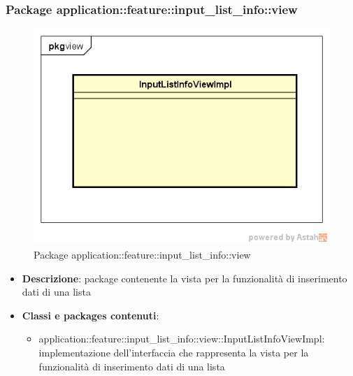 \subsubsection{Package application::feature::input\_list\_info::view}
\label{Package application::feature::input_list_info::view}
\begin{figure}[H]
	\centering
	\includegraphics[scale=0.5]{Sezioni/Packages/Application/input_list_info_view.png}
	\caption{Package application::feature::input\_list\_info::view}
\end{figure}
\begin{itemize}
	\item \textbf{Descrizione}: package contenente la vista per la funzionalità di inserimento dati di una lista
	\item \textbf{Classi e packages contenuti}:
	\begin{itemize}
	\item application::feature::input\_list\_info::view::InputListInfoViewImpl: implementazione dell'interfaccia che rappresenta la vista per la funzionalità di inserimento dati di una lista
	\end{itemize}
\end{itemize}

